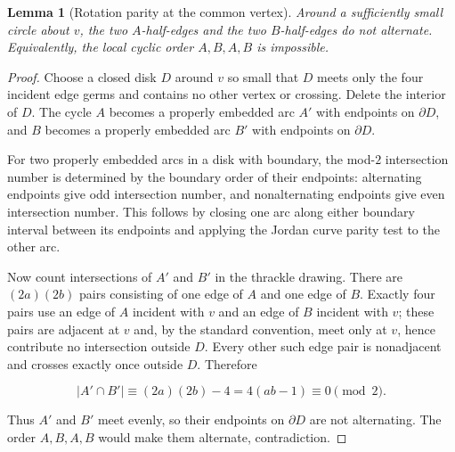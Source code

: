 \documentclass[11pt]{amsart}
\newtheorem{lemma}[theorem]{Lemma}
\theoremstyle{definition}
\begin{document}
\begin{lemma}[Rotation parity at the common vertex]
Around a sufficiently small circle about \(v\), the two \(A\)-half-edges and the two \(B\)-half-edges do not alternate. Equivalently, the local cyclic order \(A,B,A,B\) is impossible.

\end{lemma}
\begin{proof}
Choose a closed disk \(D\) around \(v\) so small that \(D\) meets only the four incident edge germs and contains no other vertex or crossing. Delete the interior of \(D\). The cycle \(A\) becomes a properly embedded arc \(A'\) with endpoints on \(\partial D\), and \(B\) becomes a properly embedded arc \(B'\) with endpoints on \(\partial D\).

For two properly embedded arcs in a disk with boundary, the mod-\(2\) intersection number is determined by the boundary order of their endpoints: alternating endpoints give odd intersection number, and nonalternating endpoints give even intersection number. This follows by closing one arc along either boundary interval between its endpoints and applying the Jordan curve parity test to the other arc.

Now count intersections of \(A'\) and \(B'\) in the thrackle drawing. There are \((2a)(2b)\) pairs consisting of one edge of \(A\) and one edge of \(B\). Exactly four pairs use an edge of \(A\) incident with \(v\) and an edge of \(B\) incident with \(v\); these pairs are adjacent at \(v\) and, by the standard convention, meet only at \(v\), hence contribute no intersection outside \(D\). Every other such edge pair is nonadjacent and crosses exactly once outside \(D\). Therefore

\[
|A'\cap B'|\equiv (2a)(2b)-4=4(ab-1)\equiv0\pmod 2.
\]

Thus \(A'\) and \(B'\) meet evenly, so their endpoints on \(\partial D\) are not alternating. The order \(A,B,A,B\) would make them alternate, contradiction.

\end{proof}
\end{document}
